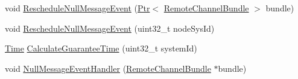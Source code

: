 \begin{DoxyCompactItemize}
void \hyperlink{classns3_1_1NullMessageSimulatorImpl_addc65b52a532801e4f2dc1fdffce2a66}{Reschedule\+Null\+Message\+Event} (\hyperlink{classns3_1_1Ptr}{Ptr}$<$ \hyperlink{classns3_1_1RemoteChannelBundle}{Remote\+Channel\+Bundle} $>$ bundle)
\item 
void \hyperlink{classns3_1_1NullMessageSimulatorImpl_ac1c623f5285e8f7e663f116f35fc915a}{Reschedule\+Null\+Message\+Event} (uint32\+\_\+t node\+Sys\+Id)
\item 
\hyperlink{classns3_1_1Time}{Time} \hyperlink{classns3_1_1NullMessageSimulatorImpl_a5d8006e0b0f3953887dcb525394f5dd3}{Calculate\+Guarantee\+Time} (uint32\+\_\+t system\+Id)
\item 
void \hyperlink{classns3_1_1NullMessageSimulatorImpl_a9bbef7568522f12c33d676e9e5108e2d}{Null\+Message\+Event\+Handler} (\hyperlink{classns3_1_1RemoteChannelBundle}{Remote\+Channel\+Bundle} $\ast$bundle)
\end{DoxyCompactItemize}
